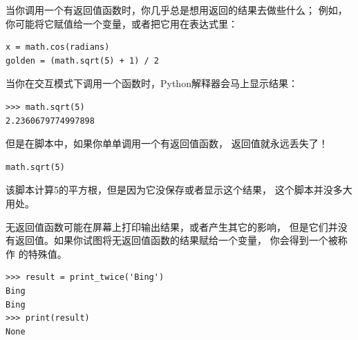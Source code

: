 
当你调用一个有返回值函数时，你几乎总是想用返回的结果去做些什么；
例如，你可能将它赋值给一个变量，或者把它用在表达式里：

\begin{lstlisting}
x = math.cos(radians)
golden = (math.sqrt(5) + 1) / 2
\end{lstlisting}

%

当你在交互模式下调用一个函数时，Python解释器会马上显示结果：

\begin{lstlisting}
>>> math.sqrt(5)
2.2360679774997898
\end{lstlisting}

%

但是在脚本中，如果你单单调用一个有返回值函数， 返回值就永远丢失了！

\begin{lstlisting}
math.sqrt(5)
\end{lstlisting}

%

该脚本计算5的平方根，但是因为它没保存或者显示这个结果，
这个脚本并没多大用处。
  


无返回值函数可能在屏幕上打印输出结果，或者产生其它的影响，
但是它们并没有返回值。如果你试图将无返回值函数的结果赋给一个变量，
你会得到一个被称作  的特殊值。
  

\begin{lstlisting}
>>> result = print_twice('Bing')
Bing
Bing
>>> print(result)
None
\end{lstlisting}

%

